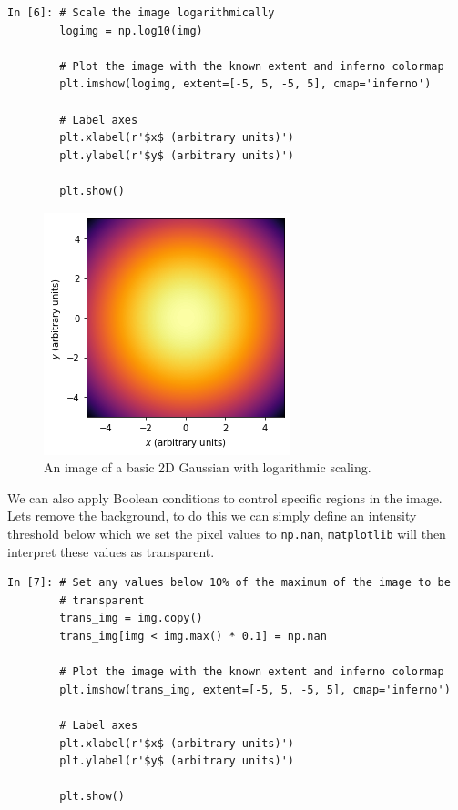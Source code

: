 \begin{lstlisting}[style=PY]
In [6]: # Scale the image logarithmically
        logimg = np.log10(img)
        
        # Plot the image with the known extent and inferno colormap
        plt.imshow(logimg, extent=[-5, 5, -5, 5], cmap='inferno')

        # Label axes
        plt.xlabel(r'$x$ (arbitrary units)')
        plt.ylabel(r'$y$ (arbitrary units)')
        
        plt.show()
\end{lstlisting}

\begin{figure}[H]
	\centering
	\includegraphics[scale=0.7]{Pictures/gaussimgexamplelog.png}
\caption{An image of a basic 2D Gaussian with logarithmic scaling.}
\label{fig:randimgnoax}
\end{figure}

We can also apply Boolean conditions to control specific regions in the image. Lets remove the background, to do this we can simply define an intensity threshold below which we set the pixel values to \texttt{np.nan}, \texttt{matplotlib} will then interpret these values as transparent.

\begin{lstlisting}[style=PY]
In [7]: # Set any values below 10% of the maximum of the image to be 
        # transparent
        trans_img = img.copy()
        trans_img[img < img.max() * 0.1] = np.nan
        
        # Plot the image with the known extent and inferno colormap
        plt.imshow(trans_img, extent=[-5, 5, -5, 5], cmap='inferno')
        
        # Label axes
        plt.xlabel(r'$x$ (arbitrary units)')
        plt.ylabel(r'$y$ (arbitrary units)')

        plt.show()
\end{lstlisting}

